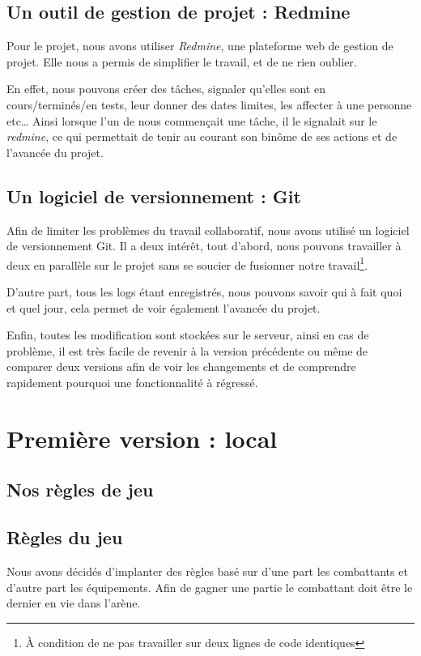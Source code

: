 \documentclass[12pt,a4paper,openany]{book}
\begin{document}
	\section{Un outil de gestion de projet : Redmine}
	Pour le projet, nous avons utiliser \textit{Redmine}, une plateforme web de gestion de projet. Elle nous a permis de simplifier le travail, et
	de ne rien oublier.

	En effet, nous pouvons créer des tâches, signaler qu'elles sont en cours/terminés/en tests, leur donner des dates limites, les affecter à une personne etc\ldots
	Ainsi lorsque l'un de nous commençait une tâche, il le signalait sur le \textit{redmine}, ce qui permettait de tenir au courant son binôme de ses actions et
	de l'avancée du projet.

	\section{Un logiciel de versionnement : Git}
	Afin de limiter les problèmes du travail collaboratif, nous avons utilisé un logiciel de versionnement Git. Il a deux intérêt, tout d'abord, nous pouvons
	travailler à deux en parallèle sur le projet sans se soucier de fusionner notre travail\footnote{À condition de ne pas travailler sur deux lignes de code
	identiques}.

	D'autre part, tous les logs étant enregistrés, nous pouvons savoir qui à fait quoi et quel jour, cela permet de voir également l'avancée du projet. 

	Enfin, toutes les modification sont stockées sur le serveur, ainsi en cas de problème, il est très facile de revenir à la version précédente ou même de
	comparer deux versions afin de voir les changements et de comprendre rapidement pourquoi une fonctionnalité à régressé. 

	\chapter{Première version : local}
	\section{Nos règles de jeu}
	\section{Règles du jeu}
	Nous avons décidés d'implanter des règles basé sur d'une part les combattants et d'autre part les équipements. Afin de gagner une partie le combattant doit
	être le dernier en vie dans l'arène.
\end{document}
